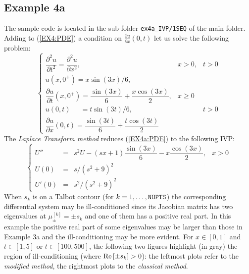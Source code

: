 \documentclass[a4paper,10pt]{report}%
\begin{document}
\subsection{Example 4a}
The sample code is located in the sub-folder {\tt ex4a\_IVP/1SEQ} of the main folder.
\\
Adding to (\ref{EX4:PDE}) a condition on $\frac{\partial u}{\partial x}(0,t)$ let us solve the following problem:
\begin{equation}\label{EX4a:PDE}
\left\{\begin{array}{lll}
\dfrac{\partial^2 u}{\partial t^2} = \dfrac{\partial^2 u}{\partial x^2},            & x>0, & t>0 \\[8pt]
u(x,0^+) = x\sin(3x)/6, \\[4pt]
\dfrac{\partial u}{\partial t}(x,0^+) = \dfrac{\sin(3x)}{6} + \dfrac{x\cos(3x)}{2}, & x\ge 0   \\[8pt]
u(0,t)\phantom{_{tt+}} = t\sin(3t)/6,                  && t > 0                                \\[8pt]
\dfrac{\partial u}{\partial x}(0,t) = \dfrac{\sin(3t)}{6} + \dfrac{t\cos(3t)}{2}
\end{array}\right.
\end{equation}
The {\em Laplace Transform method} reduces (\ref{EX4a:PDE}) to the following IVP:
\begin{equation}\label{EX4a:ODE}
\left\{\begin{array}{lcll}
U''   &=& s^2 U - (sx+1)\dfrac{\sin(3x)}{6} - x\dfrac{\cos(3x)}{2},  & x>0 \\[6pt]
U(0)  &=& s/(s^2 + 9)^2 \\[4pt]
U'(0) &=& s^2/(s^2 + 9)^2
\end{array}\right.
\end{equation}
When $s_k$ is on a Talbot contour (for $k=1,\ldots,{\tt NOPTS}$) the corresponding differential system may be
ill-conditioned since its Jacobian matrix has two eigenvalues at $\mu^{[k]}_\pm=\pm s_k$ and one of them has a
positive real part. In this example the positive real part of some eigenvalues may be larger than those in
Example 3a and the ill-conditioning may be more evident.
For $x\in[0,1]$ and $t\in[1,5]$ or $t\in[100,500]$, the following two figures highlight (in gray) the
region of ill-conditioning (where ${\rm Re}\left[\pm s_k\right]>0$): the leftmost plots refer to the
{\em modified method}, the rightmost plots to the {\em classical method}.
\end{document}
